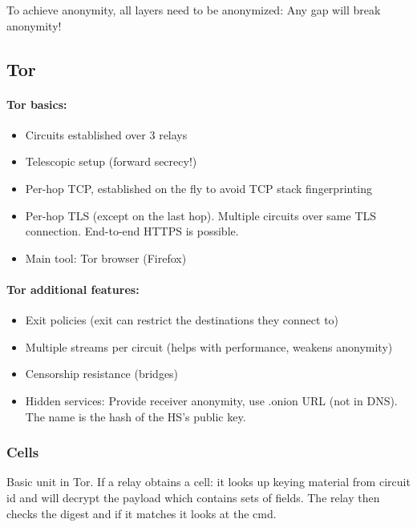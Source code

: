 To achieve anonymity, all layers need to be anonymized: Any gap will break anonymity!

\subsection{Tor}

\paragraph{Tor basics:}
\begin{itemize}
	\item Circuits established over 3 relays
	\item Telescopic setup (forward secrecy!)
	\item Per-hop TCP, established on the fly to avoid TCP stack fingerprinting
	\item Per-hop TLS (except on the last hop). Multiple circuits over same TLS connection. End-to-end HTTPS is possible.
	\item Main tool: Tor browser (Firefox)
\end{itemize}

\paragraph{Tor additional features:}

\begin{itemize}
	\item Exit policies (exit can restrict the destinations	they connect to)
	\item Multiple streams per circuit (helps with performance, weakens anonymity)
	\item Censorship resistance (bridges)
	\item Hidden services: Provide receiver anonymity, use .onion URL (not in DNS). The name is the hash of the HS’s public key.
\end{itemize}

\subsubsection{Cells}

Basic unit in Tor. If a relay obtains a cell: it looks up keying material from circuit id and will decrypt the payload which contains sets of fields. The relay then checks the digest and if it matches it looks at the cmd.

